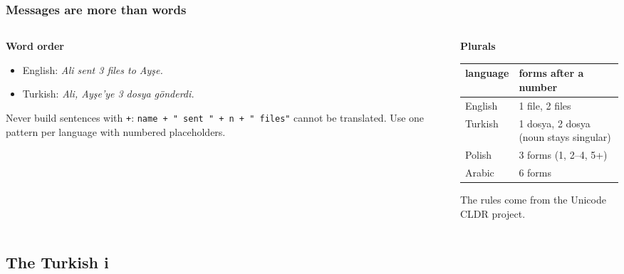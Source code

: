 \documentclass[aspectratio=169,10pt,compress]{beamer}
\begin{document}
\begin{frame}[t,fragile] \frametitle{Messages are more than words}
  \begin{columns}[T]
    \begin{column}{0.48\textwidth}
      \textbf{Word order}
      \begin{itemize}\small
        \item English: \emph{Ali sent 3 files to Ayşe.}
        \item Turkish: \emph{Ali, Ayşe'ye 3 dosya gönderdi.}
      \end{itemize}
      \small Never build sentences with \texttt{+}: \texttt{name + " sent " + n + " files"} cannot be translated.
      Use one pattern per language with numbered placeholders.
    \end{column}
    \begin{column}{0.48\textwidth}
      \textbf{Plurals}
      \begin{center}\small
      \begin{tabular}{ll}
        \toprule
        \textbf{language} & \textbf{forms after a number} \\
        \midrule
        English & 1 file, 2 files \\
        Turkish & 1 dosya, 2 dosya (noun stays singular) \\
        Polish  & 3 forms (1, 2--4, 5+) \\
        Arabic  & 6 forms \\
        \bottomrule
      \end{tabular}
      \end{center}
      \small The rules come from the Unicode CLDR project.
    \end{column}
  \end{columns}
\end{frame}


\subsection[Case]{The Turkish i}
\end{document}
